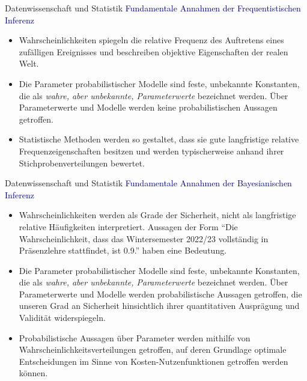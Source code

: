 \documentclass[
  8pt,
  ignorenonframetext,
]{beamer}
\begin{document}
\begin{frame}{Datenwissenschaft und Statistik}
\protect\hypertarget{datenwissenschaft-und-statistik-13}{}
\textcolor{darkblue}{Fundamentale Annahmen der Frequentistischen Inferenz}
\vspace{1mm}

\begin{itemize}
\item
  \justifying Wahrscheinlichkeiten spiegeln die relative Frequenz des
  Auftretens eines zufälligen Ereignisses und beschreiben objektive
  Eigenschaften der realen Welt. \vspace{1mm}
\item
  Die Parameter probabilistischer Modelle sind feste, unbekannte
  Konstanten, die als \emph{wahre, aber unbekannte, Parameterwerte}
  bezeichnet werden. Über Parameterwerte und Modelle werden keine
  probabilistischen Aussagen getroffen. \vspace{1mm}
\item
  Statistische Methoden werden so gestaltet, dass sie gute langfristige
  relative Frequenzeigenschaften besitzen und werden typischerweise
  anhand ihrer Stichprobenverteilungen bewertet.
\end{itemize}
\end{frame}

\begin{frame}{Datenwissenschaft und Statistik}
\protect\hypertarget{datenwissenschaft-und-statistik-14}{}
\textcolor{darkblue}{Fundamentale Annahmen der Bayesianischen Inferenz}
\vspace{1mm}

\begin{itemize}
\item
  \justifying Wahrscheinlichkeiten werden als Grade der Sicherheit,
  nicht als langfristige relative Häufigkeiten interpretiert. Aussagen
  der Form ``Die Wahrscheinlichkeit, dass das Wintersemester 2022/23
  vollständig in Präsenzlehre stattfindet, ist 0.9.'' haben eine
  Bedeutung. \vspace{1mm}
\item
  Die Parameter probabilistischer Modelle sind feste, unbekannte
  Konstanten, die als \emph{wahre, aber unbekannte, Parameterwerte}
  bezeichnet werden. Über Parameterwerte und Modelle werden
  probabilistische Aussagen getroffen, die unseren Grad an Sicherheit
  hinsichtlich ihrer quantitativen Ausprägung und Validität
  widerspiegeln. \vspace{1mm}
\item
  Probabilistische Aussagen über Parameter werden mithilfe von
  Wahrscheinlichkeitsverteilungen getroffen, auf deren Grundlage
  optimale Entscheidungen im Sinne von Kosten-Nutzenfunktionen getroffen
  werden können.
\end{itemize}
\end{frame}
\end{document}
